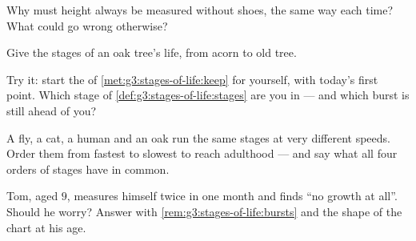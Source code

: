\begin{exercise}[$\star$]\label{exo:g3:stages-of-life:6}
Why must height always be measured without shoes, the same way
each time? What could go wrong otherwise?
\end{exercise}

\begin{exercise}[$\star$]\label{exo:g3:stages-of-life:7}
Give the stages of an oak tree's life, from acorn to old tree.
\end{exercise}

\begin{exercise}[$\star$]\label{exo:g3:stages-of-life:8}
Try it: start the  of
\cref{met:g3:stages-of-life:keep} for yourself, with today's
first point. Which stage of \cref{def:g3:stages-of-life:stages}
are you in --- and which burst is still ahead of you?
\end{exercise}

\begin{exercise}[$\star\star$]\label{exo:g3:stages-of-life:9}
A fly, a cat, a human and an oak run the same stages at very
different speeds. Order them from fastest to slowest to reach
adulthood --- and say what all four orders of stages have in
common.
\end{exercise}

\begin{exercise}[$\star\star$]\label{exo:g3:stages-of-life:10}
Tom, aged $9$, measures himself twice in one month and finds
``no growth at all''. Should he worry? Answer with
\cref{rem:g3:stages-of-life:bursts} and the shape of the chart
at his age.
\end{exercise}
